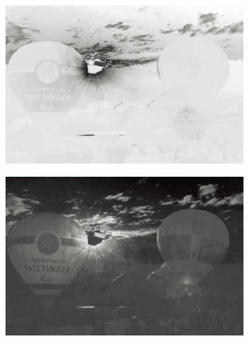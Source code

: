 \documentclass[letterpaper,10pt]{article}
\begin{document}
\begin{figure}[htbp]
\begin{subfigure}{0.11\textwidth}
					\captionsetup{font=scriptsize}
					\label{fig: Y1}	
				\end{subfigure}
				\begin{subfigure}{0.11\textwidth}
					\includegraphics[width=\linewidth]{picture/LLIE/Division Gets Better/Cb1}
					\captionsetup{font=scriptsize}
					\label{fig: Cb1}	
				\end{subfigure}
				\begin{subfigure}{0.11\textwidth}
					\includegraphics[width=\linewidth]{picture/LLIE/Division Gets Better/Cr1}
					\captionsetup{font=scriptsize}
					\label{fig: Cr1}	
				\end{subfigure}
				\begin{subfigure}{0.11\textwidth}

\end{subfigure}
\end{figure}
\end{document}
